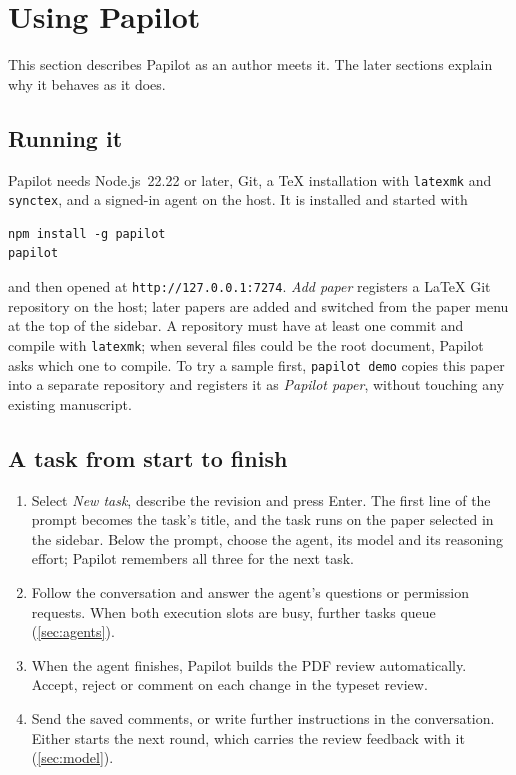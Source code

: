 \section{Using Papilot}
\label{sec:using}

This section describes Papilot as an author meets it. The later sections
explain why it behaves as it does.

\subsection{Running it}

Papilot needs Node.js~22.22 or later, Git, a \TeX{} installation with
\texttt{latexmk} and \texttt{synctex}, and a signed-in agent on the host. It is
installed and started with
\begin{verbatim}
npm install -g papilot
papilot
\end{verbatim}
and then opened at \texttt{http://127.0.0.1:7274}. \emph{Add paper} registers a
\LaTeX{} Git repository on the host; later papers are added and switched from
the paper menu at the top of the sidebar. A repository must have at least one
commit and compile with \texttt{latexmk}; when several files could be the root
document, Papilot asks which one to compile. To try a sample first, \texttt{papilot demo}
copies this paper into a separate repository and registers it as
\emph{Papilot paper}, without touching any existing manuscript.

\subsection{A task from start to finish}

\begin{enumerate}
  \item Select \emph{New task}, describe the revision and press Enter. The first
    line of the prompt becomes the task's title, and the task runs on the paper
    selected in the sidebar. Below the prompt, choose the agent, its model and
    its reasoning effort; Papilot remembers all three for the next task.
  \item Follow the conversation and answer the agent's questions or permission
    requests. When both execution slots are busy, further tasks queue
    (\cref{sec:agents}).
  \item When the agent finishes, Papilot builds the PDF review automatically.
    Accept, reject or comment on each change in the typeset review.
  \item Send the saved comments, or write further instructions in the
    conversation. Either starts the next round, which carries the review
    feedback with it (\cref{sec:model}).
\end{enumerate}

